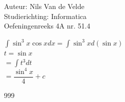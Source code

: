 \documentclass[a4paper]{article}
\begin{document}
  
\noindent \large Auteur: Nils Van de Velde \\
\noindent \large Studierichting: Informatica\\
\noindent \large Oefeningenreeks 4A nr. 51.4\\

\medskip

\normalsize

$\displaystyle\int\sin^3x\cos xdx = \displaystyle\int\sin^3xd(\sin x)$\\

$t = \sin x$\\

$=\displaystyle\int t^3dt$\\

$=\dfrac{\sin^4x}{4}+c$\\

\begin{thebibliography}{999}
\end{thebibliography}
\end{document}
